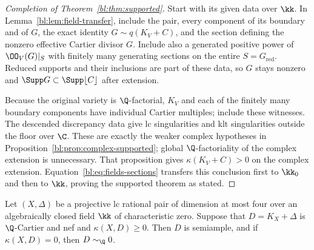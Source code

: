 \begin{proof}[Completion of Theorem~\ref{bl:thm:supported}]
Start with its given data over $\kk$.  In
Lemma~\ref{bl:lem:field-transfer}, include the pair, every component
of its boundary and of $G$, the exact identity
$G\sim q(K_V+C)$, and the section defining the nonzero effective
Cartier divisor $G$.  Include also a generated positive power of
$\OO_V(G)|_S$ with finitely many generating sections on the
entire $S=G_{\mathrm{red}}$.  Reduced supports and their
inclusions are part of these data, so $G$ stays nonzero and
$\Supp G\subset\Supp\lfloor C\rfloor$ after extension.

Because the original variety is $\Q$-factorial, $K_V$ and each
of the finitely many boundary components have individual Cartier
multiples; include these witnesses.  The descended discrepancy
data give lc singularities and klt singularities outside the
floor over $\C$.  These are exactly the weaker complex
hypotheses in Proposition~\ref{bl:prop:complex-supported}; global
$\Q$-factoriality of the complex extension is unnecessary.
That proposition gives $\kappa(K_V+C)>0$ on the complex
extension.  Equation~\eqref{bl:eq:fields-sections} transfers this
conclusion first to $\kk_0$ and then to $\kk$, proving the
supported theorem as stated.
\end{proof}

\begin{corollary}
\label{cor:abundance-after-nonvanishing-fields}
Let $(X,\Delta)$ be a projective lc rational pair of dimension at most
four over an algebraically closed field $\kk$ of characteristic zero.
Suppose that $D=K_X+\Delta$ is $\Q$-Cartier and nef and
$\kappa(X,D)\geq0$. Then $D$ is semiample, and if $\kappa(X,D)=0$,
then $D\sim_{\Q}0$.
\end{corollary}

